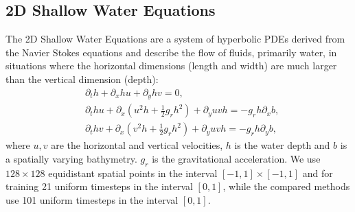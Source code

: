 \subsection{2D Shallow Water Equations}
The 2D Shallow Water Equations are a system of hyperbolic PDEs derived from the Navier Stokes equations and describe the flow of fluids, primarily water, in situations where the horizontal dimensions (length and width) are much larger than the vertical dimension (depth):
\begin{equation}
\label{eq:sw}
    \begin{aligned}
    &\partial_t h+\partial_x h u + \partial_y h v = 0, \\
    &\partial_t h u +\partial_x \left( u^2 h + \frac{1}{2} g_r h^2 \right)+\partial_y u v h = -g_r h\partial_x b,  \\
    & \partial_t h v +\partial_x \left( v^2 h + \frac{1}{2} g_r h^2 \right)+\partial_y u v h = -g_r h\partial_y b,
    \end{aligned}
\end{equation}
where $u,v$ are the horizontal and vertical velocities, $h$ is the water depth and $b$ is a spatially varying bathymetry. $g_r$ is the gravitational acceleration. We use $128\times 128$ equidistant spatial points in the interval $[-1,1]\times[-1,1]$ and for training 21 uniform timesteps in the interval $[0,1]$, while the compared methods use 101 uniform timesteps in the interval $[0,1]$.
